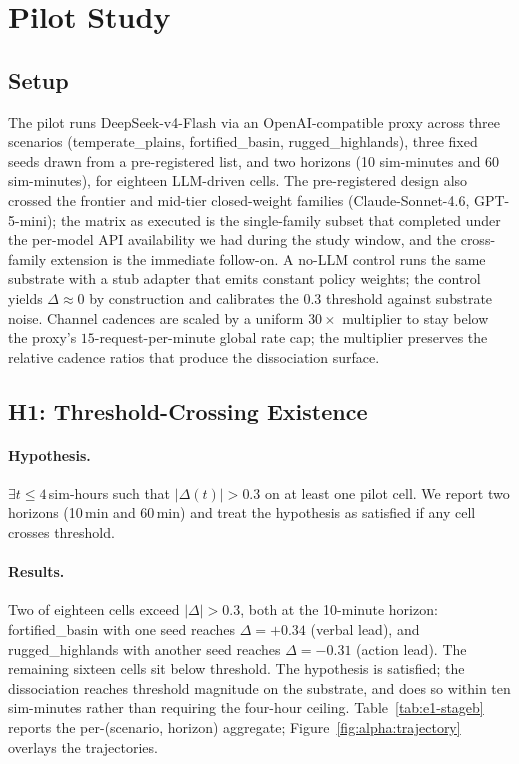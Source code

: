 \section{Pilot Study}
\label{sec:pilot}

\subsection{Setup}
\label{sec:pilot:setup}

The pilot runs DeepSeek-v4-Flash via an OpenAI-compatible proxy
across three scenarios (\textsf{temperate\_plains},
\textsf{fortified\_basin}, \textsf{rugged\_highlands}), three fixed
seeds drawn from a pre-registered list, and two horizons (10
sim-minutes and 60 sim-minutes), for eighteen LLM-driven cells.
The pre-registered design also crossed the frontier and mid-tier
closed-weight families (Claude-Sonnet-4.6, GPT-5-mini); the
matrix as executed is the single-family subset that completed
under the per-model API availability we had during the study
window, and the cross-family extension is the immediate follow-on.
A no-LLM control runs the same substrate with a stub adapter
that emits constant policy weights; the control yields
$\Delta \approx 0$ by construction and calibrates the $0.3$
threshold against substrate noise. Channel cadences are scaled by
a uniform $30\times$ multiplier to stay below the proxy's
$15$-request-per-minute global rate cap; the multiplier preserves
the relative cadence ratios that produce the dissociation
surface.

\subsection{H1: Threshold-Crossing Existence}
\label{sec:pilot:h1}

\paragraph{Hypothesis.}
$\exists t \leq 4$\,sim-hours such that $|\Delta(t)| > 0.3$ on at
least one pilot cell. We report two horizons (10\,min and 60\,min)
and treat the hypothesis as satisfied if any cell crosses
threshold.

\paragraph{Results.}
Two of eighteen cells exceed $|\Delta| > 0.3$, both at the
10-minute horizon:
\textsf{fortified\_basin} with one seed reaches $\Delta = +0.34$
(verbal lead), and \textsf{rugged\_highlands} with another seed
reaches $\Delta = -0.31$ (action lead). The remaining sixteen
cells sit below threshold. The hypothesis is satisfied; the
dissociation reaches threshold magnitude on the substrate, and
does so within ten sim-minutes rather than requiring the
four-hour ceiling. Table~\ref{tab:e1-stageb} reports the
per-(scenario, horizon) aggregate;
Figure~\ref{fig:alpha:trajectory} overlays the trajectories.


